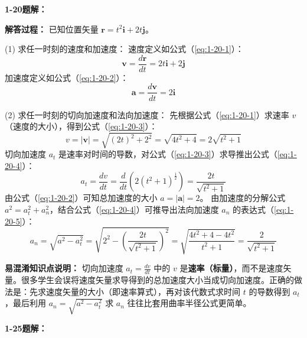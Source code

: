 \vspace{2em}

\textbf{1-20题解：}
\setcounter{equation}{0}
\renewcommand{\theHequation}{1-20.\arabic{equation}}

\textbf{解答过程：}
已知位置矢量 $\mathbf{r} = t^2\mathbf{i} + 2t\mathbf{j}$。

(1) 求任一时刻的速度和加速度：
速度定义如公式（\ref{eq:1-20-1}）：
\begin{equation}\label{eq:1-20-1}
	\mathbf{v} = \frac{d\mathbf{r}}{dt} = 2t\mathbf{i} + 2\mathbf{j}
\end{equation}
加速度定义如公式（\ref{eq:1-20-2}）：
\begin{equation}\label{eq:1-20-2}
	\mathbf{a} = \frac{d\mathbf{v}}{dt} = 2\mathbf{i}
\end{equation}

(2) 求任一时刻的切向加速度和法向加速度：
先根据公式（\ref{eq:1-20-1}）求速率 $v$（速度的大小），得到公式（\ref{eq:1-20-3}）：
\begin{equation}\label{eq:1-20-3}
	v = |\mathbf{v}| = \sqrt{(2t)^2 + 2^2} = \sqrt{4t^2 + 4} = 2\sqrt{t^2+1}
\end{equation}
切向加速度 $a_t$ 是速率对时间的导数，对公式（\ref{eq:1-20-3}）求导推出公式（\ref{eq:1-20-4}）：
\begin{equation}\label{eq:1-20-4}
	a_t = \frac{dv}{dt} = \frac{d}{dt}\left(2(t^2+1)^{\frac{1}{2}}\right) = \frac{2t}{\sqrt{t^2+1}}
\end{equation}
由公式（\ref{eq:1-20-2}）可知总加速度的大小 $a = |\mathbf{a}| = 2$。
由加速度的分解公式 $a^2 = a_t^2 + a_n^2$，结合公式（\ref{eq:1-20-4}）可推导出法向加速度 $a_n$ 的表达式（\ref{eq:1-20-5}）：
\begin{equation}\label{eq:1-20-5}
	a_n = \sqrt{a^2 - a_t^2} = \sqrt{2^2 - \left(\frac{2t}{\sqrt{t^2+1}}\right)^2} = \sqrt{\frac{4t^2+4-4t^2}{t^2+1}} = \frac{2}{\sqrt{t^2+1}}
\end{equation}

\textbf{易混淆知识点说明：}
切向加速度 $a_t = \frac{dv}{dt}$ 中的 $v$ 是\textbf{速率（标量）}，而不是速度矢量。很多学生会误将速度矢量求导得到的总加速度大小当成切向加速度。正确的做法是：先求速度矢量的大小（即速率算式），再对该代数式求时间 $t$ 的导数得到 $a_t$，最后利用 $a_n = \sqrt{a^2 - a_t^2}$ 求 $a_n$ 往往比套用曲率半径公式更简单。

\vspace{2em}

\textbf{1-25题解：}
\setcounter{equation}{0}
\renewcommand{\theHequation}{1-25.\arabic{equation}}

